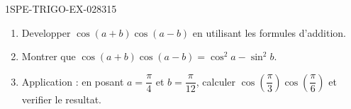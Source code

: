 \begin{exercice}{1SPE-TRIGO-EX-028}{3}{15}
\begin{enumerate}
  \item Developper $\cos(a+b)\cos(a-b)$ en utilisant les formules d'addition.
  \item Montrer que $\cos(a+b)\cos(a-b) = \cos^2 a - \sin^2 b$.
  \item Application : en posant $a = \dfrac{\pi}{4}$ et $b = \dfrac{\pi}{12}$, calculer $\cos\!\left(\dfrac{\pi}{3}\right)\cos\!\left(\dfrac{\pi}{6}\right)$ et verifier le resultat.
\end{enumerate}
\end{exercice}
